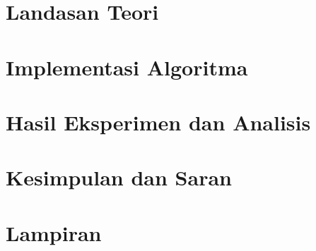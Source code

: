 \documentclass[10pt,a4paper]{report}
\begin{document}
\chapter{Landasan Teori}


\chapter{Implementasi Algoritma}


\chapter{Hasil Eksperimen dan Analisis}


\chapter{Kesimpulan dan Saran}


\chapter{Lampiran}





\end{document}
